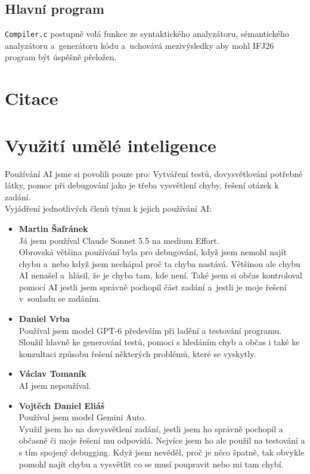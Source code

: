 \documentclass[a4paper, 12pt]{article}
\begin{document}
\subsection{Hlavní program}
\label{sub:compiler}
\texttt{Compiler.c} postupně volá funkce ze syntaktického analyzátoru, sémantického analyzátoru a~generátoru kódu a~uchovává mezivýsledky aby mohl IFJ26 program být úspěšně přeložen.

\section{Citace}
\label{sec:citace}

\section{Využití umělé inteligence}
\label{sec:ai}
Používání AI jsme si povolili pouze pro:
Vytváření testů, dovysvětlování potřebné látky, pomoc při debugování jako je třeba vysvětlení chyby, řešení otázek k zadání.\\
Vyjádření jednotlivých členů týmu k jejich používání AI:
\begin{itemize}
    \item \textbf{Martin Šafránek} \\
        Já jsem používal Claude Sonnet 5.5 na medium Effort.\\
        Obrovská většina používání byla pro debugování, když jsem nemohl najít chybu a~nebo když jsem nechápal proč ta chyba nastává. Většinou ale chybu AI nenašel a~hlásil, že je chyba tam, kde není. Také jsem si občas kontroloval pomocí AI jestli jsem správně pochopil část zadání a~jestli je moje řešení v~souladu se zadáním.
        
    \item \textbf{Daniel Vrba} \\
        Používal jsem model GPT-6 především při ladění a testování programu. Sloužil hlavně ke generování testů, pomoci s hledáním chyb a občas i také ke konzultaci způsobu řešení některých problémů, které se vyskytly.
        
    \item \textbf{Václav Tomaník} \\
        AI jsem nepoužíval.
    \item \textbf{Vojtěch Daniel Eliáš} \\
        Používal jsem model Gemini Auto. \\
        Využil jsem ho na dovysvětlení zadání, jestli jsem ho správně pochopil a občasně či moje řešení mu odpovídá. Nejvíce jsem ho ale použil na testování a s tím spojený debugging. Když jsem nevěděl, proč je něco špatně, tak obvykle pomohl najít chybu a vysvětlit co se musí poupravit nebo mi tam chybí. 
\end{itemize}
\end{document}
